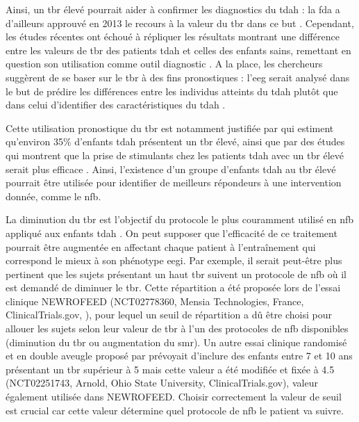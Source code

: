 Ainsi, un \gls{tbr} élevé pourrait aider à confirmer les diagnostics du \gls{tdah} : la \gls{fda} a d'ailleurs approuvé en 2013 le recours à la valeur du 
\gls{tbr} dans ce but \citep{NebaHealth, FDA, Saad2018, Barry2009}. Cependant, les études récentes ont échoué à répliquer les résultats
montrant une différence entre les valeurs de \gls{tbr} des patients \gls{tdah} et celles des enfants sains, remettant en question son utilisation comme outil 
diagnostic \citep{Zhang2017, Arns2013, Clarke2001, VanDoren2017, Lenartowicz2014}. A la place, les chercheurs suggèrent de se baser sur le \gls{tbr} à des fins pronostiques : l'\gls{eeg} 
serait analysé dans le but de prédire les différences entre les individus atteints du \gls{tdah} plutôt que dans celui d'identifier 
des caractéristiques du \gls{tdah} \citep{Arns2013, Zhang2017}. 

Cette utilisation pronostique du \gls{tbr} est notamment justifiée par \citet{Clarke2011} qui estiment qu'environ 35\% d'enfants \gls{tdah} présentent un \gls{tbr} élevé, ainsi que 
par des études qui montrent que la prise de stimulants chez les patients \gls{tdah} avec un \gls{tbr} élevé serait plus efficace \citep{Arns2012med, Clarke2002}. 
Ainsi, l'existence d'un groupe d'enfants \gls{tdah} au \gls{tbr} élevé pourrait être utilisée pour identifier de meilleurs répondeurs à une intervention donnée, comme le \gls{nfb}. 

La diminution du \gls{tbr} est l'objectif du protocole le plus couramment utilisé en \gls{nfb} appliqué aux enfants \gls{tdah} \citep{Arns2014}. 
On peut supposer que l'efficacité de ce traitement pourrait être augmentée en affectant chaque patient à l'entraînement qui correspond le mieux à son phénotype \gls{eegi}. 
Par exemple, il serait peut-être plus pertinent que les sujets présentant un haut \gls{tbr} suivent un protocole de \gls{nfb} où il est demandé de 
diminuer le \gls{tbr}. Cette répartition a été proposée lors de l'essai clinique NEWROFEED (NCT02778360, Mensia Technologies, France, ClinicalTrials.gov, \citet{Bioulac2019}), pour lequel un seuil de répartition a dû être choisi pour allouer les sujets 
selon leur valeur de \gls{tbr} à l'un des protocoles de \gls{nfb} disponibles (diminution du \gls{tbr} ou augmentation du \gls{smr}). 
Un autre essai clinique randomisé et en double aveugle proposé par \citet{Kerson2013} prévoyait d'inclure des enfants entre 7 et 10 ans présentant un \gls{tbr} supérieur à 5 mais cette valeur a 
été modifiée et fixée à 4.5 (NCT02251743, Arnold, Ohio State University, ClinicalTrials.gov), valeur également
utilisée dans NEWROFEED. Choisir correctement la valeur de seuil est crucial car cette valeur détermine quel protocole de \gls{nfb} le patient va suivre. 

